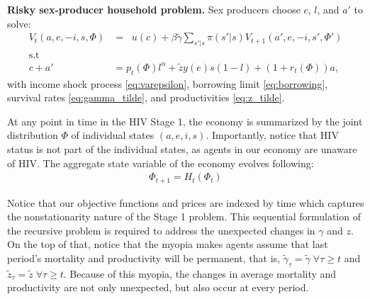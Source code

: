 \noindent \textbf{Risky sex-producer household problem.} Sex producers choose $c$, $l$, and $a'$ to solve:
\begin{align}
V_t(a,e,-i,s,\Phi) &= \mathop{\max_{c\geq 0, 1\geq l\geq 0,a' \geq 0}}  u(c) + \beta \widetilde{\gamma} \sum_{s'|s}\pi(s'|s)V_{t+1}(a',e,-i,s',\Phi') \label{eq:DP-i_1}\\
\mbox{s.t}\nonumber\\
c +a'&= p_t(\Phi)l^{\alpha}+\widetilde{z}y(e)s(1-l) + (1+r_t(\Phi))a \label{eq:BC-i_1},
\end{align}
with income shock process \eqref{eq:varepsilon}, borrowing limit \eqref{eq:borrowing}, survival rates \eqref{eq:gamma_tilde}, and productivities \eqref{eq:z_tilde}. 

At any point in time in the HIV Stage 1, the economy is summarized by the joint distribution $\Phi$ of individual states $(a,e,i,s)$. Importantly, notice that HIV status is not part of the individual states, as agents in our economy are unaware of HIV. The aggregate state variable of the economy evolves following:
\begin{align}
\Phi_{t+1} = H_t (\Phi_t)    
\end{align}

Notice that our objective functions and prices are indexed by time which captures the nonstationarity nature of the Stage 1 problem. This sequential formulation of the recursive problem is required to address the unexpected changes in $\gamma$ and $z$. On the top of that, notice that the myopia makes agents assume that last period's mortality and productivity will be permanent, that is, $\widetilde{\gamma}_\tau = \widetilde{\gamma} \; \forall \tau \geq t$ and $\widetilde{z}_\tau = \widetilde{z} \; \forall \tau \geq t$. Because of this myopia, the changes in average mortality and productivity are not only unexpected, but also occur at every period. 


